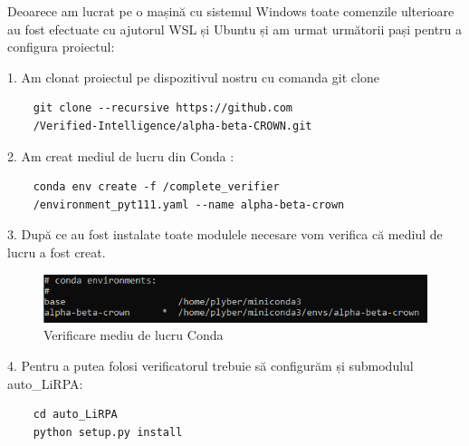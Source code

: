 \documentclass{beamer}
\begin{document}
\begin{frame}[containsverbatim]
Deoarece am lucrat pe o mașină cu sistemul Windows toate comenzile ulterioare au fost efectuate cu ajutorul WSL și Ubuntu și am urmat următorii pași pentru a configura proiectul:
    \item 1. Am clonat proiectul pe dispozitivul nostru cu comanda git clone 
    \begin{verbatim}
    git clone --recursive https://github.com
    /Verified-Intelligence/alpha-beta-CROWN.git
    \end{verbatim}
    \item 2. Am creat mediul de lucru din Conda :
    \begin{verbatim}
    conda env create -f /complete_verifier
    /environment_pyt111.yaml --name alpha-beta-crown
    \end{verbatim}
    
\end{frame}
\begin{frame}[containsverbatim]
  
  \item 3. După ce au fost instalate toate modulele necesare vom verifica că mediul de lucru a fost creat.
        \begin{figure}[!h]
          \includegraphics[width=\linewidth]{1condaenvs.PNG}
          \caption{Verificare mediu de lucru Conda}
          \label{fig:mediilucruconda}
        \end{figure}
        
    \item 4. Pentru a putea folosi verificatorul trebuie să configurăm și submodulul auto\_LiRPA: 
     \begin{verbatim}
    cd auto_LiRPA
    python setup.py install
    \end{verbatim}
\end{frame}
\end{document}
